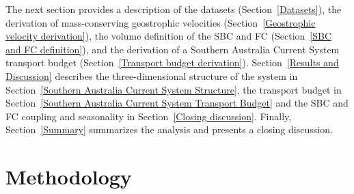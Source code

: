 \documentclass[preprint,3p,review,12pt]{elsarticle}
\begin{document}
The next section provides a description of the datasets (Section~\ref{Datasets}), the derivation of mass-conserving geostrophic velocities (Section~\ref{Geostrophic velocity derivation}), the volume definition of the SBC and FC (Section~\ref{SBC and FC definition}), and the derivation of a Southern Australia Current System transport budget (Section~\ref{Transport budget derivation}). Section~\ref{Results and Discussion} describes the three-dimensional structure of the system in Section~\ref{Southern Australia Current System Structure}, the transport budget in Section~\ref{Southern Australia Current System Transport Budget} and the SBC and FC coupling and seasonality in Section~\ref{Closing discussion}. Finally, Section~\ref{Summary} summarizes the analysis and presents a closing discussion.

\section{Methodology} \label{Methodology}
\end{document}
